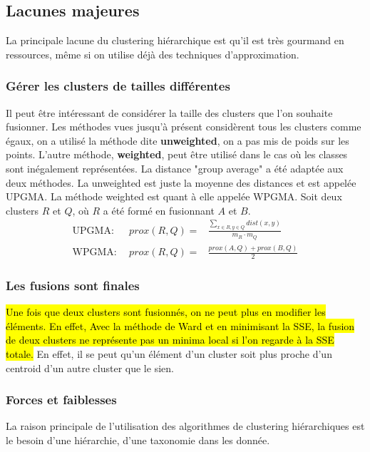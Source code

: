 \documentclass[letterpaper, 12pt]{article}
\newcommand{\alinea}{
\hspace*{0.5cm}}
\begin{document}
		\subsection{Lacunes majeures}
			\alinea La principale lacune du clustering hiérarchique est
				qu'il est très gourmand en ressources, même si on utilise
				déjà des techniques d'approximation.
			\subsubsection{Gérer les clusters de tailles différentes}
				\alinea Il peut être intéressant de considérer la taille
					des clusters que l'on souhaite fusionner. Les méthodes
					vues jusqu'à présent considèrent tous les clusters
					comme égaux, on a utilisé la méthode dite
					\textbf{unweighted}, on a pas mis de poids sur les 
					points. L'autre méthode, \textbf{weighted}, peut
					être utilisé dans le cas où les classes sont
					inégalement représentées. La distance "group average"
					a été adaptée aux deux méthodes. La unweighted
					est juste la moyenne des distances et est appelée
					UPGMA. La méthode weighted est quant à elle appelée
					WPGMA. Soit deux clusters $R$ et $Q$, où $R$ a été 
					formé en fusionnant $A$ et $B$.
					\begin{align*}
						\text{UPGMA}:&\ \ prox(R, Q) =&
							\frac{\sum_{{x \in R, 
							y \in Q}}dist(x, y)}%
								{m_R \cdot m_Q} \\
						\text{WPGMA}:&\ \ prox(R, Q) =&
							\frac{prox(A, Q) + prox(B, Q)}{2}
					\end{align*}
			\subsubsection{Les fusions sont finales}
				\alinea \hl{Une fois que deux clusters sont fusionnés, on ne
					peut plus en modifier les éléments. En effet, 
					Avec la méthode de Ward et en minimisant la SSE, 
					la fusion de deux clusters ne représente pas un
					minima local si l'on regarde à la SSE totale. }
					En effet, il se peut qu'un élément d'un cluster soit
					plus proche d'un centroid d'un autre cluster que le sien.
			\subsubsection{Forces et faiblesses}
				\alinea La raison principale de l'utilisation des
					algorithmes de clustering hiérarchiques est le
					besoin d'une hiérarchie, d'une taxonomie dans les
					donnée.
	\newpage
\end{document}
